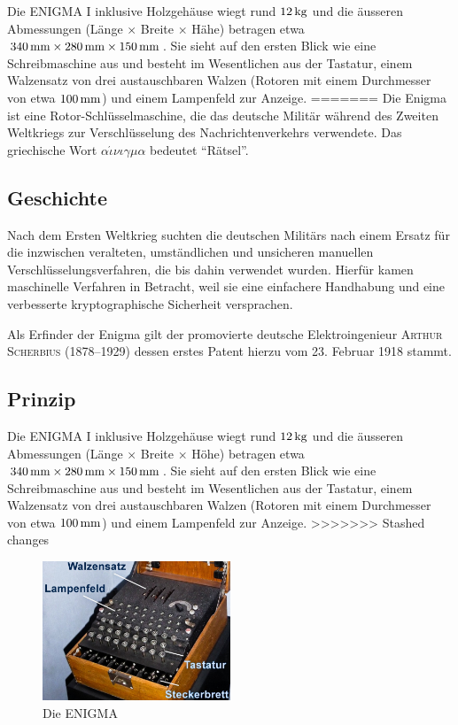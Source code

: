 \documentclass[%
<<<<<<< Updated upstream
11pt,%
twoside,%
titlepage,%
german,%
headsepline%
]{scrartcl}
\begin{document}
Die ENIGMA I inklusive Holzgehäuse wiegt rund $\unit[12]{kg}$ und die äusseren Abmessungen (Länge $\times$ Breite $\times$ Hähe) betragen etwa $\unit[340]{mm}\times\unit[280]{mm}\times\unit[150]{mm}$. Sie sieht auf den ersten Blick wie eine Schreibmaschine aus und besteht im Wesentlichen aus der Tastatur, einem Walzensatz von drei austauschbaren Walzen (Rotoren mit einem Durchmesser von etwa $\unit[100]{mm}$) und einem Lampenfeld zur Anzeige.
=======
Die Enigma ist eine Rotor-Schlüsselmaschine, die das deutsche Militär während des Zweiten Weltkriegs zur Verschlüsselung des Nachrichtenverkehrs verwendete. Das griechische Wort $\alpha\acute{\iota}\nu\iota\gamma\mu\alpha$ bedeutet \enquote{Rätsel}.

\subsection{Geschichte}

Nach dem Ersten Weltkrieg suchten die deutschen Militärs nach einem Ersatz für die inzwischen veralteten, umständlichen und unsicheren manuellen Verschlüsselungsverfahren, die bis dahin verwendet wurden. Hierfür kamen maschinelle Verfahren in Betracht, weil sie eine einfachere Handhabung und eine verbesserte kryptographische Sicherheit versprachen.

Als Erfinder der Enigma gilt der promovierte deutsche Elektroingenieur \textsc{Arthur Scherbius} (1878--1929) dessen erstes Patent hierzu vom 23. Februar 1918 stammt.

\subsection{Prinzip}

Die ENIGMA I inklusive Holzgehäuse wiegt rund $\unit[12]{kg}$ und die äusseren Abmessungen (Länge $\times$ Breite $\times$ Höhe) betragen etwa $\unit[340]{mm}\times\unit[280]{mm}\times\unit[150]{mm}$. Sie sieht auf den ersten Blick wie eine Schreibmaschine aus und besteht im Wesentlichen aus der Tastatur, einem Walzensatz von drei austauschbaren Walzen (Rotoren mit einem Durchmesser von etwa $\unit[100]{mm}$) und einem Lampenfeld zur Anzeige.
>>>>>>> Stashed changes

\begin{figure}
\begin{center}
\includegraphics[width=0.5\textwidth]{pictures/enigma.jpg}
\caption{Die ENIGMA}\label{abb:enigma}
\end{center}
\end{figure}
\end{document}
